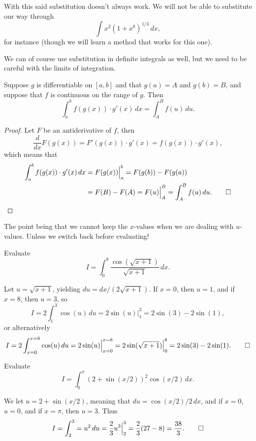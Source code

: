 \noindent
With this said substitution doesn't always work. We will not be able to substitute our way through
\[
	\int x^2 (1 + x^8)^{1/3} \, d x,
\]
for instance (though we will learn a method that works for this one).

We can of course use substitution in definite integrals as well, but we need to be careful with the limits of integration.

\begin{theorem}
	Suppose $g$ is differentiable on $[a, b]$ and that $g(a) = A$ and $g(b) = B$, and suppose that $f$ is continuous on the range of $g$. Then
	\[
		\int_a^b f(g(x)) \cdot g'(x) \, d x = \int_A^B f(u) \, d u.
	\]
\end{theorem}

\begin{proof}
	Let $F$ be an antiderivative of $f$, then
	\[
		\frac{d}{d x} F(g(x)) = F'(g(x)) \cdot g'(x) = f(g(x)) \cdot g'(x),
	\]
	which means that
	\begin{align*}
		\int_a^b f(g(x)) \cdot g'(x) \, d x & = F(g(x)) \Big \rvert_a^b = F(g(b)) - F(g(a))                         \\
		                                    & = F(B) - F(A) = F(u) \Big \rvert_A^B = \int_A^B f(u) \, d u. \qedhere
	\end{align*}
\end{proof}

\noindent
The point being that we cannot keep the $x$-values when we are dealing with $u$-values. Unless we switch back before evaluating!

\begin{example}
	Evaluate
	\[
		I = \int_0^8 \frac{\cos(\sqrt{x + 1})}{\sqrt{x + 1}} \, d x.
	\]

	\noindent
	Let $u = \sqrt{x + 1}$, yielding $d u = d x / (2 \sqrt{x + 1})$. If $x = 0$, then $u = 1$, and if $x = 8$, then $u = 3$, so
	\[
		I = 2 \int_1^3 \cos(u) \, d u = 2 \sin(u) \Big \rvert_1^3 = 2 \sin(3) - 2 \sin(1),
	\]
	or alternatively
	\[
		I = 2 \int_{x = 0}^{x = 8} \cos(u) \, d u = 2 \sin(u) \Big \rvert_{x = 0}^{x = 8} = 2 \sin(\sqrt{x + 1}) \Big \rvert_0^8 = 2 \sin(3) - 2 \sin(1). \qedhere
	\]
\end{example}

\begin{example}
	Evaluate
	\[
		I = \int_0^\pi (2 + \sin(x / 2))^2 \cos(x / 2) \, d x.
	\]

	\noindent
	We let $u = 2 + \sin(x / 2)$, meaning that $d u = \cos(x / 2) / 2 \, d x$, and if $x = 0$, $u = 0$, and if $x = \pi$, then $u = 3$. Thus
	\[
		I = \int_2^3 = u^2 \, d u = \frac{2}{3} u^3 \Big \rvert_2^3 = \frac{2}{3} (27 - 8) = \frac{38}{3}. \qedhere
	\]
\end{example}

